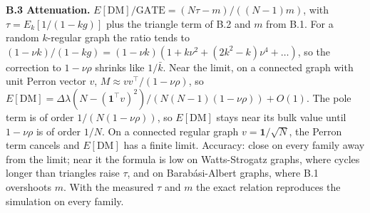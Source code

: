\documentclass[final,5p,times,twocolumn,number]{elsarticle}
\begin{document}
\textbf{B.3 Attenuation.} $E[\mathrm{DM}]/\mathrm{GATE} = (N\tau - m)/((N - 1)m)$, with $\tau = E_k[1/(1 - kg)]$  plus the triangle term of B.2 and $m$  from B.1. For a random $k$-regular graph the ratio tends to $(1 - \nu k)/(1 - kg) = (1 - \nu k)(1 + k\nu^2 + (2k^2 - k)\nu^4 + \dots)$, so the correction to $1 - \nu\rho$  shrinks like $1/\bar k$. Near the limit, on a connected graph with unit Perron vector $v$, $M \approx vv^{\top}/(1 - \nu\rho)$, so $E[\mathrm{DM}] = \Delta\lambda(N - (\mathbf{1}^{\top}v)^2)/(N(N - 1)(1 - \nu\rho)) + O(1)$. The pole term is of order $1/(N(1 - \nu\rho))$, so $E[\mathrm{DM}]$  stays near its bulk value until $1 - \nu\rho$  is of order $1/N$. On a connected regular graph $v = \mathbf{1}/\sqrt N$, the Perron term cancels and $E[\mathrm{DM}]$  has a finite limit. Accuracy: close on every family away from the limit; near it the formula is low on Watts-Strogatz graphs, where cycles longer than triangles raise $\tau$, and on Barabási-Albert graphs, where B.1 overshoots $m$. With the measured $\tau$  and $m$  the exact relation reproduces the simulation on every family.
\end{document}
